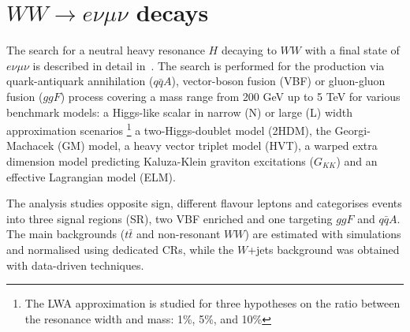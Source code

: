 \documentclass{PoS}
\begin{document}
\section{$WW\rightarrow e\nu \mu \nu$ decays}
\label{sec:WW}
\vspace*{-2mm}
The search for a neutral heavy resonance $H$ decaying to $WW$ with a final state of $e\nu \mu \nu$ is described in detail in~\cite{HIGG-2016-31}. 
The search is performed for the production via quark-antiquark annihilation ($q\bar{q}A$), vector-boson fusion (VBF) or gluon-gluon fusion ($ggF$) process covering a mass range from 200 GeV up to 5 TeV for various benchmark models: a Higgs-like scalar in narrow (N) or large (L) width approximation scenarios
\footnote{
The LWA approximation is studied for three hypotheses on the ratio between the resonance width and mass: 1\%, 5\%, and 10\% }
a two-Higgs-doublet model (2HDM), the Georgi-Machacek (GM) model, a heavy vector triplet model (HVT), a warped extra dimension model predicting  Kaluza-Klein graviton excitations ($G_{KK}$) and an effective Lagrangian model (ELM).

The analysis studies opposite sign, different flavour leptons and categorises events into three signal regions (SR), two VBF enriched and one targeting $ggF$ and $q\bar{q}A$. 
The main backgrounds ($t\bar{t}$ and non-resonant $WW$) are estimated with simulations  and normalised using dedicated CRs, while the $W$+jets background was obtained with data-driven techniques. 
\end{document}
